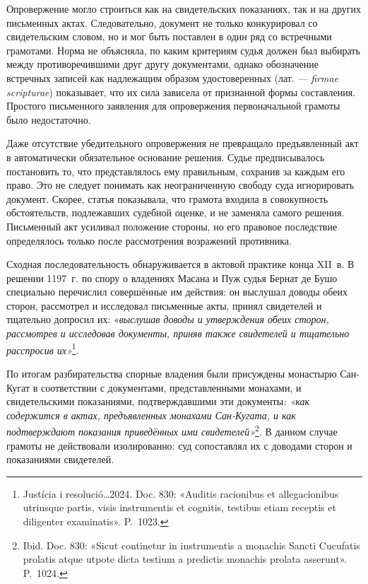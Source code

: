 Опровержение могло строиться как на свидетельских показаниях, так и на других письменных актах. Следовательно, документ не только конкурировал со свидетельским словом, но и мог быть поставлен в один ряд со встречными грамотами. Норма не объясняла, по каким критериям судья должен был выбирать между противоречившими друг другу документами, однако обозначение встречных записей как надлежащим образом удостоверенных (лат. --- \emph{firmae}\emph{ }\emph{scripturae}) показывает, что их сила зависела от признанной формы составления. Простого письменного заявления для опровержения первоначальной грамоты было недостаточно.

Даже отсутствие убедительного опровержения не превращало предъявленный акт в автоматически обязательное основание решения. Судье предписывалось постановить то, что представлялось ему правильным, сохранив за каждым его право. Это не следует понимать как неограниченную свободу суда игнорировать документ. Скорее, статья показывала, что грамота входила в совокупность обстоятельств, подлежавших судебной оценке, и не заменяла самого решения. Письменный акт усиливал положение стороны, но его правовое последствие определялось только после рассмотрения возражений противника.

Сходная последовательность обнаруживается в актовой практике конца XII~в. В решении 1197~г. по спору о владениях Масана и Пуж судья Бернат де Бушо специально перечислил совершённые им действия: он выслушал доводы обеих сторон, рассмотрел и исследовал письменные акты, принял свидетелей и тщательно допросил их: «\emph{выслушав доводы и утверждения обеих сторон, рассмотрев и исследовав документы, приняв также свидетелей и тщательно расспросив их»}\footnote{Justícia i resolució…2024. Doc. 830: «Auditis racionibus et allegacionibus utriusque partis, visis instrumentis et cognitis, testibus etiam receptis et diligenter examinatis». P.~1023.}.

По итогам разбирательства спорные владения были присуждены монастырю Сан-Кугат в соответствии с документами, представленными монахами, и свидетельскими показаниями, подтверждавшими эти документы\emph{: «как содержится в актах, предъявленных монахами Сан-}\emph{Кугата}\emph{, и как подтверждают показания приведённых ими свидетелей»}\footnote{Ibid. Doc. 830: «Sicut continetur in instrumentis a monachis Sancti Cucufatis prolatis atque utpote dicta testium a predictis monachis prolata asserunt». P.~1024.}. В данном случае грамоты не действовали изолированно: суд сопоставлял их с доводами сторон и показаниями свидетелей.

